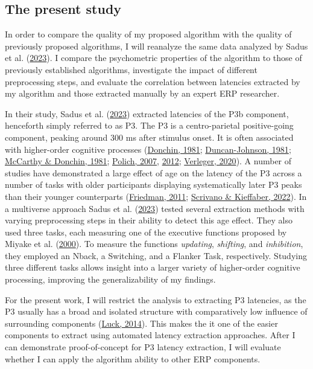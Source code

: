 \documentclass[
  man]{apa7}
\begin{document}
\hypertarget{the-present-study}{%
\subsection{The present study}\label{the-present-study}}

In order to compare the quality of my proposed algorithm with the quality of previously proposed algorithms, I will reanalyze the same data analyzed by Sadus et al. (\protect\hyperlink{ref-sadus2023multiverse}{2023}). I compare the psychometric properties of the algorithm to those of previously established algorithms, investigate the impact of different preprocessing steps, and evaluate the correlation between latencies extracted by my algorithm and those extracted manually by an expert ERP researcher.

In their study, Sadus et al. (\protect\hyperlink{ref-sadus2023multiverse}{2023}) extracted latencies of the P3b component, henceforth simply referred to as P3. The P3 is a centro-parietal positive-going component, peaking around 300 ms after stimulus onset. It is often associated with higher-order cognitive processes (\protect\hyperlink{ref-donchin1981surprise}{Donchin, 1981}; \protect\hyperlink{ref-duncan1981young}{Duncan-Johnson, 1981}; \protect\hyperlink{ref-mccarthy1981metric}{McCarthy \& Donchin, 1981}; \protect\hyperlink{ref-polich2007updating}{Polich, 2007}, \protect\hyperlink{ref-polich2012neuropsychology}{2012}; \protect\hyperlink{ref-verleger2020effects}{Verleger, 2020}). A number of studies have demonstrated a large effect of age on the latency of the P3 across a number of tasks with older participants displaying systematically later P3 peaks than their younger counterparts (\protect\hyperlink{ref-friedman2012components}{Friedman, 2011}; \protect\hyperlink{ref-scrivano2022behavioral}{Scrivano \& Kieffaber, 2022}). In a multiverse approach Sadus et al. (\protect\hyperlink{ref-sadus2023multiverse}{2023}) tested several extraction methods with varying preprocessing steps in their ability to detect this age effect. They also used three tasks, each measuring one of the executive functions proposed by Miyake et al. (\protect\hyperlink{ref-miyake2000unity}{2000}). To measure the functions \emph{updating}, \emph{shifting}, and \emph{inhibition}, they employed an Nback, a Switching, and a Flanker Task, respectively. Studying three different tasks allows insight into a larger variety of higher-order cognitive processing, improving the generalizability of my findings.

For the present work, I will restrict the analysis to extracting P3 latencies, as the P3 usually has a broad and isolated structure with comparatively low influence of surrounding components (\protect\hyperlink{ref-luck2014introduction}{Luck, 2014}). This makes the it one of the easier components to extract using automated latency extraction approaches. After I can demonstrate proof-of-concept for P3 latency extraction, I will evaluate whether I can apply the algorithm ability to other ERP components.
\end{document}
